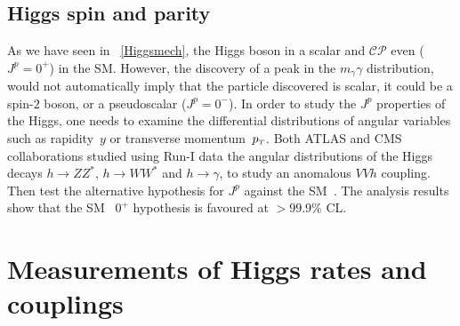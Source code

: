 \subsection{Higgs spin and parity \label{higgscp}}
As we have seen in ~\autoref{Higgsmech}, the Higgs boson in a scalar and $\mathcal{CP}$ even ($J^p= 0^+$) in the SM. However, the discovery of  a peak in the $m_\gamma \gamma$ distribution, would not automatically imply that the particle discovered is scalar, it could be a spin-$2$ boson, or a pseudoscalar  ($J^p= 0^-$). In order to study the $J^p$ properties of the Higgs, one needs to examine the differential distributions of angular variables such as rapidity~$y$ or transverse momentum~$p_{\scriptscriptstyle T}$. Both ATLAS and CMS collaborations studied using Run-I data the angular distributions of the Higgs decays $ h \to ZZ^*$, $h \to W W^*$ and $ h \to \gamma$, to study an anomalous $VVh$ coupling. Then test the alternative hypothesis for $J^p$ against the SM~\cite{ATLAS:2015zhl,CMS:2014nkk}.  The analysis results show that the SM ~$0^+$ hypothesis is favoured at $ >99.9\%$ CL. 
\section{Measurements of Higgs rates and couplings \label{sec:Higgscoupl} }
